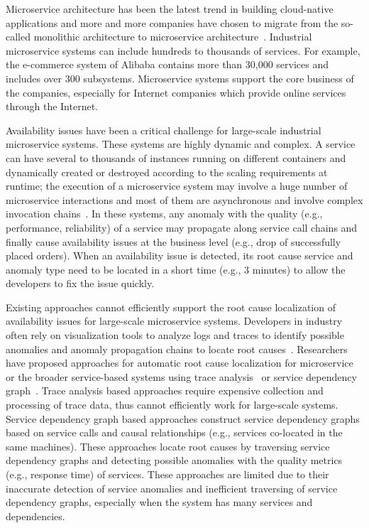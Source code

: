 Microservice architecture has been the latest trend in building cloud-native applications and more and more companies have chosen to migrate from the so-called monolithic architecture to microservice architecture~\cite{ICSA17MSTrend, Zhou_TSE18MS, Guo_FSE20Industry}.
Industrial microservice systems can include hundreds to thousands of services.
For example, the e-commerce system of Alibaba contains more than 30,000 services and includes over 300 subsystems.
Microservice systems support the core business of the companies, especially for Internet companies which provide online services through the Internet.

Availability issues have been a critical challenge for large-scale industrial microservice systems.
These systems are highly dynamic and complex.
A service can have several to thousands of instances running on different containers and dynamically created or
destroyed according to the scaling requirements at runtime;
the execution of a microservice system may involve a huge number of microservice interactions and most of them are asynchronous and involve complex invocation chains~\cite{Zhou_TSE18MS}.
In these systems, any anomaly with the quality (e.g., performance, reliability) of a service may propagate along service call chains and finally cause availability issues at the business level (e.g., drop of successfully placed orders).
When an availability issue is detected, its root cause service and anomaly type need to be located in a short time (e.g., 3 minutes) to allow the developers to fix the issue quickly.

Existing approaches cannot efficiently support the root cause localization of availability issues for large-scale microservice systems.
Developers in industry often rely on visualization tools to analyze logs and traces to identify possible anomalies and anomaly propagation chains to locate root causes~\cite{Zhou_TSE18MS, Guo_FSE20Industry}.
Researchers have proposed approaches for automatic root cause localization for microservice or the broader service-based systems using trace analysis~\cite{Cuong_traceBased, FSE2019LatentError} or service dependency graph~\cite{cscs2013monitorRank, CauseInfer2014, Hanzhang_GraphBased2019, GraphBasedformicroservice, NOMS2020MicroRCA, DCCGRID2018CloudRange, ICSOC2018Microscope}.
Trace analysis based approaches require expensive collection and processing of trace data, thus cannot efficiently work for large-scale systems.
Service dependency graph based approaches construct service dependency graphs based on service calls and causal relationships (e.g., services co-located in the same machines).
These approaches locate root causes by traversing service dependency graphs and detecting possible anomalies with the quality metrics (e.g., response time) of services.
These approaches are limited due to their inaccurate detection of service anomalies and inefficient traversing of service dependency graphs, especially when the system has many services and dependencies.

